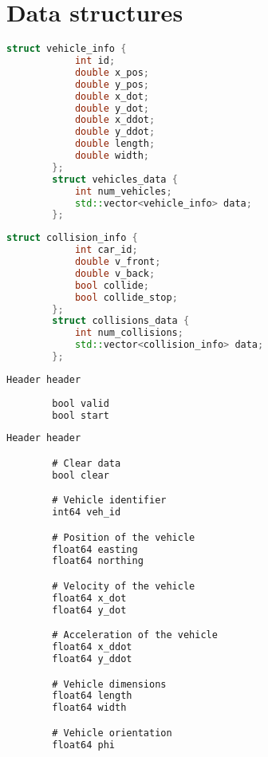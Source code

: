 \chapter{Data structures}
\label{app:code}
    \begin{lstlisting}[language=C++, caption={Vehicle data structure}, label={lst:vehicle_data}]
        struct vehicle_info {
            int id;
            double x_pos;
            double y_pos;
            double x_dot;
            double y_dot;
            double x_ddot;
            double y_ddot;
            double length;
            double width;
        };
        struct vehicles_data {
            int num_vehicles;
            std::vector<vehicle_info> data;
        };
    \end{lstlisting}

    \begin{lstlisting}[language=C++, caption={Collision data structure}, label={lst:collision_data}]
        struct collision_info {
            int car_id;
            double v_front;
            double v_back;
            bool collide;
            bool collide_stop;
        };
        struct collisions_data {
            int num_collisions;
            std::vector<collision_info> data;
        };
    \end{lstlisting}

    \newpage
    \begin{lstlisting}[language=C, caption={Start message file}, label={lst:start_msgs}]
        Header header
        
        bool valid
        bool start
    \end{lstlisting}

    \begin{lstlisting}[language=C, caption={Injector message file}, label={lst:injector_msgs}]
        Header header

        # Clear data
        bool clear

        # Vehicle identifier
        int64 veh_id

        # Position of the vehicle
        float64 easting
        float64 northing

        # Velocity of the vehicle
        float64 x_dot
        float64 y_dot

        # Acceleration of the vehicle
        float64 x_ddot
        float64 y_ddot

        # Vehicle dimensions
        float64 length
        float64 width

        # Vehicle orientation
        float64 phi
    \end{lstlisting}
